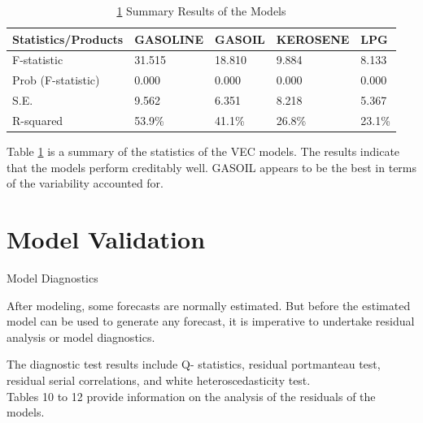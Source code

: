 \documentclass{beamer}
\begin{document}
	\begin{frame}
		\begin{table}
			\caption{ \ref{table:model_summary} Summary Results of the Models}
			\label{table:model_summary}
			\begin{tabular}{lllll}
				\toprule
				Statistics/Products & GASOLINE & GASOIL & KEROSENE & LPG \\
				\midrule
				
				F-statistic         & 31.515 & 18.810 & 9.884 & 8.133 \\ [10pt]
				Prob (F-statistic)  & 0.000 & 0.000 & 0.000 & 0.000   \\ [10pt]
				S.E.                & 9.562 & 6.351 & 8.218 & 5.367   \\ [10pt]
				R-squared           & 53.9\% & 41.1\% & 26.8\% & 23.1\% \\ [10pt]
				\bottomrule
			\end{tabular}
		\end{table}
	
		\begin{exampleblock}{}
			Table \ref{table:model_summary} is a summary of the statistics of the VEC models. The results indicate that the models perform creditably well. GASOIL appears to be the best in terms of the variability accounted for.
		\end{exampleblock}
	\end{frame}

	\section{Model Validation}
	\begin{frame}{Model Diagnostics}
		\begin{block}{}
			After modeling, some forecasts are normally estimated. But before the estimated model can be used to generate any forecast, it is imperative to undertake residual analysis or model diagnostics.
		\end{block}
		
		\begin{block}{}
			The diagnostic test results include Q- statistics, residual portmanteau test, residual serial correlations, and white heteroscedasticity test. \\
			Tables 10 to 12 provide information on the analysis of the residuals of the models.
		\end{block}
	\end{frame}
	
\end{document}
